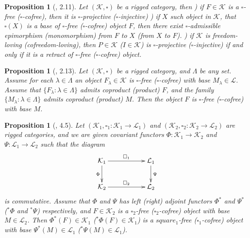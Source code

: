 \documentclass[12pt]{article}
\newtheorem{proposition}[theorem]{Proposition}
\begin{document}
\begin{proposition}[\cite{HelMetrFrQmod}, 2.11]\label{PrFrCoFrProjInjObjProp} Let $(\mathcal{K},\square)$ be a rigged category, then
) if $F\in\mathcal{K}$ is a $\square$-free ($\square$-cofree), then it is $\square$-projective ($\square$-injective)
) if $X$ such object in $\mathcal{K}$, that $\square(X)$ is a base of $\square$-free ($\square$-cofree) object $F$, then there exist $\square$-admissible epimorphism (monomorphism) from $F$ to $X$ (from $X$ to $F$).
) if $\mathcal{K}$ is freedom-loving (cofreedom-loving), then $P\in\mathcal{K}$ ($I\in\mathcal{K}$) is $\square$-projective ($\square$-injective) if and only if it is a retract of $\square$-free ($\square$-cofree) object.
\end{proposition}

\begin{proposition}[\cite{HelMetrFrQmod}, 2.13]\label{PrCoprodFrIsFr} Let $(\mathcal{K},\square)$ be a rigged category, and $\Lambda$ be any set. Assume for each 
 $\lambda \in \Lambda$ an object $F_{\lambda} \in \mathcal{K}$ is $\square$-free ($\square$-cofree) with base $M_{\lambda} \in \mathcal{L}$. Assume that $\{ F_\lambda:\lambda \in \Lambda\}$ admits coproduct (product) $F$, and the family $\{ M_\lambda:\lambda \in \Lambda\}$ admits coproduct (product) $M$. 
Then the object $F$ is $\square$-free ($\square$-cofree) with base $M$.
\end{proposition}

\begin{proposition}[\cite{HelMetrFrQmod}, 4.5]\label{PrFunctorMapFrToFr} Let $(\mathcal{K}_1, \square_1: \mathcal{K}_1 \to \mathcal{L}_1)$ and $(\mathcal{K}_2, \square_2 : \mathcal{K}_2 \to \mathcal{L}_2)$ are rigged categories,
and we are given covariant functors $\Phi : \mathcal{K}_1 \to \mathcal{K}_2$ and $\Psi : \mathcal{L}_1 \to \mathcal{L}_2$ such that the diagram
$$
\xymatrix{
{\mathcal{K}_1}\ar[d]_{\Phi}
\ar[rr]^{\square_1} & & {\mathcal{L}_1}\ar[d]^{\Psi}\\
{\mathcal{K}_2}\ar[rr]^{\square_2} & & {\mathcal{L}_2}}
$$
is commutative. Assume that $\Phi$ and $\Psi$ has left (right) adjoint functors $\Phi^*$ and $\Psi^*$ (${}^*\Phi$ and ${}^*\Psi$) respectively, and $F\in\mathcal{K}_2$ is a 
$\square_2$-free ($\square_2$-cofree) object with base $M\in\mathcal{L}_2$.
Then $\Phi^*(F)\in\mathcal{K}_1$ (${}^*\Phi(F)\in\mathcal{K}_1$) is a $square_1$-free ($\square_1$-cofree) object with base $\Psi^*(M)\in\mathcal{L}_1$ (${}^*\Psi(M)\in\mathcal{L}_1$). 
\end{proposition}
\end{document}
